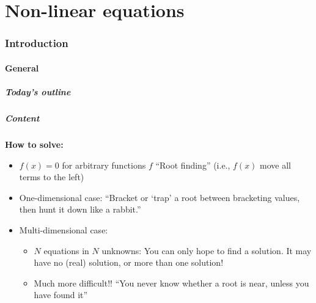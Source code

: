 \part{Non-linear equations}
\section{Introduction}
\subsection*{General}
\begin{frame}[label=contents_integration]
  \frametitle{Today's outline}
\end{frame}

\begin{frame}[fragile]
    \frametitle{Content}
  
    \textbf{How to solve:}
    \begin{itemize}
      \item \(f(x) = 0\) for arbitrary functions \(f\) “Root finding” (i.e., \(f(x)\) move all terms to the left)
      \item One-dimensional case: “Bracket or ‘trap’ a root between bracketing values, then hunt it down like a rabbit.”
      \item Multi-dimensional case:
      \begin{itemize}
        \item \(N\) equations in \(N\) unknowns: You can only hope to find a solution. It may have no (real) solution, or more than one solution!
        \item Much more difficult!! “You never know whether a root is near, unless you have found it”
      \end{itemize}
    \end{itemize}
  \end{frame}
  
